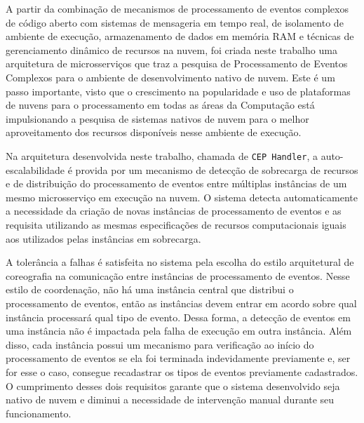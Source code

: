 A partir da combinação de mecanismos de processamento de eventos complexos de código aberto com sistemas de mensageria em tempo real, de isolamento de ambiente de execução, armazenamento de dados em memória RAM e técnicas de gerenciamento dinâmico de recursos na nuvem, foi criada neste trabalho uma arquitetura de microsserviços que traz a pesquisa de Processamento de Eventos Complexos para o ambiente de desenvolvimento nativo de nuvem. Este é um passo importante, visto que o crescimento na popularidade e uso de plataformas de nuvens para o processamento em todas as áreas da Computação está impulsionando a pesquisa de sistemas nativos de nuvem para o melhor aproveitamento dos recursos disponíveis nesse ambiente de execução.

Na arquitetura desenvolvida neste trabalho, chamada de \texttt{CEP Handler}, a auto-escalabilidade é provida por um mecanismo de detecção de sobrecarga de recursos e de distribuição do processamento de eventos entre múltiplas instâncias de um mesmo microsserviço em execução na nuvem. O sistema detecta automaticamente a necessidade da criação de novas instâncias de processamento de eventos e as requisita utilizando as mesmas especificações de recursos computacionais iguais aos utilizados pelas instâncias em sobrecarga. 

A tolerância a falhas é satisfeita no sistema pela escolha do estilo arquitetural de coreografia na comunicação entre instâncias de processamento de eventos. Nesse estilo de coordenação, não há uma instância central que distribui o processamento de eventos, então as instâncias devem entrar em acordo sobre qual instância processará qual tipo de evento. Dessa forma, a detecção de eventos em uma instância não é impactada pela falha de execução em outra instância. Além disso, cada instância possui um mecanismo para verificação ao início do processamento de eventos se ela foi terminada indevidamente previamente e, ser for esse o caso, consegue recadastrar os tipos de eventos previamente cadastrados. O cumprimento desses dois requisitos garante que o sistema desenvolvido seja nativo de nuvem e diminui a necessidade de intervenção manual durante seu funcionamento. %

